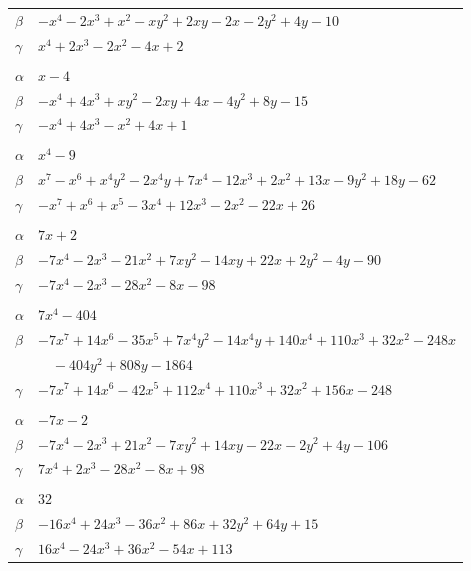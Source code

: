 \documentclass[11pt]{article}
\begin{document}
\begin{longtable}{@{}ll@{}}
$\beta$ & $-x^{4}-2x^{3}+x^{2}-xy^{2}+2xy-2x-2y^{2}+4y-10$\\
$\gamma$ & $x^{4}+2x^{3}-2x^{2}-4x+2$\\
\addlinespace[3pt]
\multicolumn{2}{@{}l}{$\{i,j\}=\{8,20\}$, $k_{ij}=3\cdot 5$}\\
$\alpha$ & $x-4$\\
$\beta$ & $-x^{4}+4x^{3}+xy^{2}-2xy+4x-4y^{2}+8y-15$\\
$\gamma$ & $-x^{4}+4x^{3}-x^{2}+4x+1$\\
\addlinespace[3pt]
\multicolumn{2}{@{}l}{$\{i,j\}=\{8,25\}$, $k_{ij}=2^{3}\cdot 11$}\\
$\alpha$ & $x^{4}-9$\\
$\beta$ & $x^{7}-x^{6}+x^{4}y^{2}-2x^{4}y+7x^{4}-12x^{3}+2x^{2}+13x-9y^{2}+18y-62$\\
$\gamma$ & $-x^{7}+x^{6}+x^{5}-3x^{4}+12x^{3}-2x^{2}-22x+26$\\
\addlinespace[3pt]
\multicolumn{2}{@{}l}{$\{i,j\}=\{8,27\}$, $k_{ij}=2^{7}\cdot 3$}\\
$\alpha$ & $7x+2$\\
$\beta$ & $-7x^{4}-2x^{3}-21x^{2}+7xy^{2}-14xy+22x+2y^{2}-4y-90$\\
$\gamma$ & $-7x^{4}-2x^{3}-28x^{2}-8x-98$\\
\addlinespace[3pt]
\multicolumn{2}{@{}l}{$\{i,j\}=\{8,31\}$, $k_{ij}=2^{6}\cdot 3\cdot 11$}\\
$\alpha$ & $7x^{4}-404$\\
$\beta$ & $-7x^{7}+14x^{6}-35x^{5}+7x^{4}y^{2}-14x^{4}y+140x^{4}+110x^{3}+32x^{2}-248x$\\
 & $\quad -404y^{2}+808y-1864$\\
$\gamma$ & $-7x^{7}+14x^{6}-42x^{5}+112x^{4}+110x^{3}+32x^{2}+156x-248$\\
\addlinespace[3pt]
\multicolumn{2}{@{}l}{$\{i,j\}=\{8,33\}$, $k_{ij}=2^{4}\cdot 5^{2}$}\\
$\alpha$ & $-7x-2$\\
$\beta$ & $-7x^{4}-2x^{3}+21x^{2}-7xy^{2}+14xy-22x-2y^{2}+4y-106$\\
$\gamma$ & $7x^{4}+2x^{3}-28x^{2}-8x+98$\\
\addlinespace[3pt]
\multicolumn{2}{@{}l}{$\{i,j\}=\{9,12\}$, $k_{ij}=3^{2}\cdot 5$}\\
$\alpha$ & $32$\\
$\beta$ & $-16x^{4}+24x^{3}-36x^{2}+86x+32y^{2}+64y+15$\\
$\gamma$ & $16x^{4}-24x^{3}+36x^{2}-54x+113$\\

\end{longtable}
\end{document}
